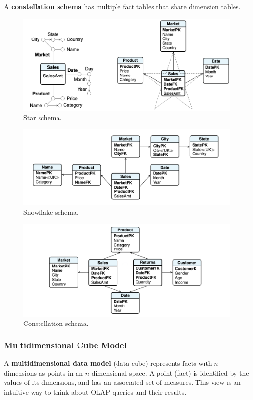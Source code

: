 A \textbf{constellation schema} has multiple fact tables that share dimension tables.
\begin{figure}[H]
    \centering
    \includegraphics[width=0.65\linewidth]{img/star_schema.png}
    \caption{Star schema.}
    \label{fig:star-schema}
\end{figure} 
\begin{figure}[H]
    \centering
    \includegraphics[width=0.65\linewidth]{img/snowflake_schema.png}
    \caption{Snowflake schema.}
    \label{fig:snowflake-schema}
\end{figure}
\begin{figure}[H]
    \centering
    \includegraphics[width=0.65\linewidth]{img/constellation_schema.png}
    \caption{Constellation schema.}
    \label{fig:constellation-schema}
\end{figure}

\subsubsection{Multidimensional Cube Model}

A \textbf{multidimensional data model} (data cube) represents facts with $n$ dimensions as points in an $n$-dimensional space. A point (fact) is identified by the values of its dimensions, and has an associated set of measures. This view is an intuitive way to think about OLAP queries and their results.

